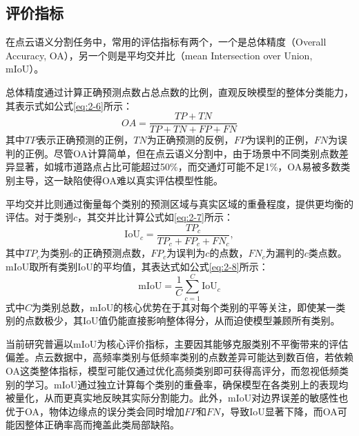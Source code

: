\subsection{评价指标}
在点云语义分割任务中，常用的评估指标有两个，一个是总体精度（Overall Accuracy, OA），另一个则是平均交并比（mean Intersection over Union, mIoU）。

总体精度通过计算正确预测点数占总点数的比例，直观反映模型的整体分类能力，其表示式如公式\eqref{eq:2-6}所示：
\begin{equation}
    \label{eq:2-6}
    OA = \frac{TP + TN}{TP + TN + FP + FN}
\end{equation}
其中$TP$表示正确预测的正例，$TN$为正确预测的反例，$FP$为误判的正例，$FN$为误判的正例。尽管OA计算简单，但在点云语义分割中，由于场景中不同类别点数差异显著，如城市道路点占比可能超过50\%，而交通灯可能不足1\%，OA易被多数类别主导，这一缺陷使得OA难以真实评估模型性能。

平均交并比则通过衡量每个类别的预测区域与真实区域的重叠程度，提供更均衡的评估。对于类别$c$，其交并比计算公式如\eqref{eq:2-7}所示：
\begin{equation}
    \label{eq:2-7}
    \text{IoU}_c = \frac{TP_c}{TP_c + FP_c + FN_c},
\end{equation}
其中$TP_c$为类别$c$的正确预测点数，$FP_c$为误判为$c$的点数，$FN_c$为漏判的$c$类点数。mIoU取所有类别IoU的平均值，其表达式如公式\eqref{eq:2-8}所示：
\begin{equation}
    \label{eq:2-8}
    \text{mIoU} = \frac{1}{C} \sum_{c=1}^C \text{IoU}_c
\end{equation}
式中$C$为类别总数，mIoU的核心优势在于其对每个类别的平等关注，即使某一类别的点数极少，其IoU值仍能直接影响整体得分，从而迫使模型兼顾所有类别。

当前研究普遍以mIoU为核心评价指标，主要因其能够克服类别不平衡带来的评估偏差。点云数据中，高频率类别与低频率类别的点数差异可能达到数百倍，若依赖OA这类整体指标，模型可能仅通过优化高频类别即可获得高评分，而忽视低频类别的学习。mIoU通过独立计算每个类别的重叠率，确保模型在各类别上的表现均被量化，从而更真实地反映其实际分割能力。此外，mIoU对边界误差的敏感性也优于OA，物体边缘点的误分类会同时增加$FP$和$FN$，导致IoU显著下降，而OA可能因整体正确率高而掩盖此类局部缺陷。%
